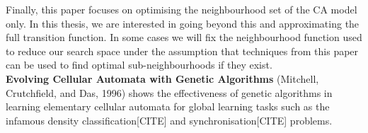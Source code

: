 Finally, this paper focuses on optimising the neighbourhood set of the CA model only. In this thesis, we are interested in going beyond this and approximating the full transition function. In some cases we will fix the neighbourhood function used to reduce our search space under the assumption that techniques from this paper can be used to find optimal sub-neighbourhoods if they exist.\\

\noindent
\textbf{Evolving Cellular Automata with Genetic Algorithms} (Mitchell, Crutchfield, and Das, 1996) \cite{mitchell1996evolving} shows the effectiveness of genetic algorithms in learning elementary cellular automata for global learning tasks such as the infamous density classification[CITE] and synchronisation[CITE] problems.\\

